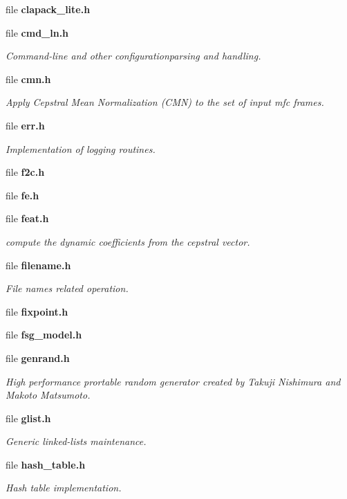 \begin{DoxyCompactItemize}
file {\bfseries clapack\-\_\-lite.\-h}
\item 
file {\bf cmd\-\_\-ln.\-h}
\begin{DoxyCompactList}\small\item\em Command-\/line and other configurationparsing and handling. \end{DoxyCompactList}\item 
file {\bf cmn.\-h}
\begin{DoxyCompactList}\small\item\em Apply Cepstral Mean Normalization (C\-M\-N) to the set of input mfc frames. \end{DoxyCompactList}\item 
file {\bf err.\-h}
\begin{DoxyCompactList}\small\item\em Implementation of logging routines. \end{DoxyCompactList}\item 
file {\bfseries f2c.\-h}
\item 
file {\bfseries fe.\-h}
\item 
file {\bf feat.\-h}
\begin{DoxyCompactList}\small\item\em compute the dynamic coefficients from the cepstral vector. \end{DoxyCompactList}\item 
file {\bf filename.\-h}
\begin{DoxyCompactList}\small\item\em File names related operation. \end{DoxyCompactList}\item 
file {\bfseries fixpoint.\-h}
\item 
file {\bfseries fsg\-\_\-model.\-h}
\item 
file {\bf genrand.\-h}
\begin{DoxyCompactList}\small\item\em High performance prortable random generator created by Takuji Nishimura and Makoto Matsumoto. \end{DoxyCompactList}\item 
file {\bf glist.\-h}
\begin{DoxyCompactList}\small\item\em Generic linked-\/lists maintenance. \end{DoxyCompactList}\item 
file {\bf hash\-\_\-table.\-h}
\begin{DoxyCompactList}\small\item\em Hash table implementation. \end{DoxyCompactList}\item 

\end{DoxyCompactItemize}

